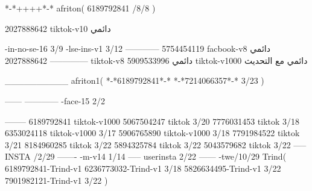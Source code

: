 *-*++++*-*
afriton(
6189792841 /8/8
)

2027888642 tiktok-v10
دائمي

-in-no-se-16 3/9
-lse-ins-v1 3/12
------------
5754454119 facbook-v8
دائمي
--------------
2027888642 tiktok-v8
دائمي
5909533996 tiktok-v1000
دائمي مع التحديث

__________
afriton1(
*-*6189792841*-*
*-*7214066357*-* 3/23
)


------
------------
-face-15 2/2

--------
6189792841 tiktok-v1000
5067504247 tiktok 3/20
7776031453 tiktok 3/18
6353024118 tiktok-v1000 3/17
5906765890 tiktok-v1000 3/18
7791984522 tiktok 3/21
8184960285 tiktok 3/22
5894325784 tiktok 3/22
5043579682 tiktok 3/22
-----
 INSTA /2/29
-------
-m-v14 1/14
-----
userinsta 2/22
------
-twe/10/29
Trind(
6189792841-Trind-v1 
6236773032-Trind-v1 3/18
5826634495-Trind-v1 3/22
7901982121-Trind-v1 3/22
)
